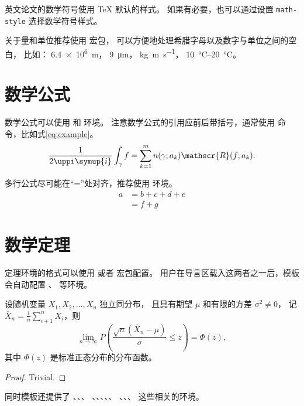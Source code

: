 英文论文的数学符号使用 \TeX{} 默认的样式。
如果有必要，也可以通过设置 \verb|math-style| 选择数学符号样式。

关于量和单位推荐使用
\href{http://mirrors.ctan.org/macros/latex/contrib/siunitx/siunitx.pdf}{}
宏包，
可以方便地处理希腊字母以及数字与单位之间的空白，
比如：
\SI{6.4e6}{m}，
\SI{9}{\micro\meter}，
\si{kg.m.s^{-1}}，
\SIrange{10}{20}{\degreeCelsius}。

\section{数学公式}

数学公式可以使用  和  环境。
注意数学公式的引用应前后带括号，通常使用  命令，比如式\eqref{eq:example}。
\begin{equation}
  \frac{1}{2 \uppi \symup{i}} \int_\gamma f = \sum_{k=1}^m n(\gamma; a_k) \mathscr{R}(f; a_k).
  \label{eq:example}
\end{equation}

多行公式尽可能在“=”处对齐，推荐使用  环境。
\begin{align}
  a & = b + c + d + e \\
    & = f + g
\end{align}

\section{数学定理}

定理环境的格式可以使用  或者  宏包配置。
用户在导言区载入这两者之一后，模板会自动配置 、 等环境。

\begin{theorem}
  设随机变量 $X_1, X_2, \dots, X_n$ 独立同分布， 且具有期望 $\mu$ 和有限的方差 $\sigma^2 \ne 0$，
  记 $\bar{X}_n = \frac{1}{n} \sum_{i+1}^n X_i$，则
  \begin{equation}
    \lim_{n \to \infty} P \left(\frac{\sqrt{n} \left( \bar{X}_n - \mu \right)}{\sigma} \le z \right) = \Phi(z),
  \end{equation}
  其中 $\Phi(z)$ 是标准正态分布的分布函数。
\end{theorem}
\begin{proof}
  Trivial.
\end{proof}

同时模板还提供了 、、、
、、、、、
、、、 这些相关的环境。

